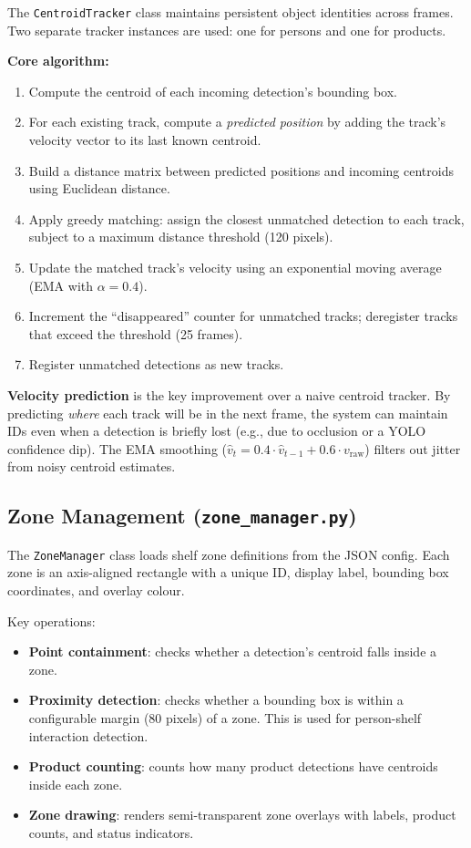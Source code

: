 \documentclass[12pt,a4paper]{article}
\begin{document}
The \texttt{CentroidTracker} class maintains persistent object identities across frames.
Two separate tracker instances are used: one for persons and one for products.

\textbf{Core algorithm:}
\begin{enumerate}[nosep]
    \item Compute the centroid of each incoming detection's bounding box.
    \item For each existing track, compute a \textit{predicted position} by adding the track's velocity vector to its last known centroid.
    \item Build a distance matrix between predicted positions and incoming centroids using Euclidean distance.
    \item Apply greedy matching: assign the closest unmatched detection to each track, subject to a maximum distance threshold (120 pixels).
    \item Update the matched track's velocity using an exponential moving average (EMA with $\alpha = 0.4$).
    \item Increment the ``disappeared'' counter for unmatched tracks; deregister tracks that exceed the threshold (25 frames).
    \item Register unmatched detections as new tracks.
\end{enumerate}

\textbf{Velocity prediction} is the key improvement over a naive centroid tracker.
By predicting \textit{where} each track will be in the next frame, the system can maintain IDs even when a detection is briefly lost (e.g., due to occlusion or a YOLO confidence dip).
The EMA smoothing ($\hat{v}_t = 0.4 \cdot \hat{v}_{t-1} + 0.6 \cdot v_\text{raw}$) filters out jitter from noisy centroid estimates.

\subsection{Zone Management (\texttt{zone\_manager.py})}

The \texttt{ZoneManager} class loads shelf zone definitions from the JSON config.
Each zone is an axis-aligned rectangle with a unique ID, display label, bounding box coordinates, and overlay colour.

Key operations:
\begin{itemize}[nosep]
    \item \textbf{Point containment}: checks whether a detection's centroid falls inside a zone.
    \item \textbf{Proximity detection}: checks whether a bounding box is within a configurable margin (80 pixels) of a zone. This is used for person-shelf interaction detection.
    \item \textbf{Product counting}: counts how many product detections have centroids inside each zone.
    \item \textbf{Zone drawing}: renders semi-transparent zone overlays with labels, product counts, and status indicators.
\end{itemize}
\end{document}
